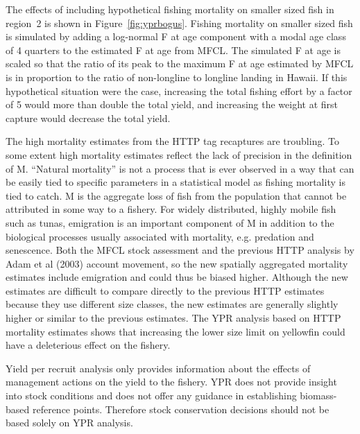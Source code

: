 \documentclass[12pt,letterpaper]{article}
\newcommand\help[1]{\color{Magenta}{\it #1 }\normalcolor}
\begin{document}
The effects of including hypothetical fishing mortality on smaller
sized fish in region~2 is shown in Figure~\ref{fig:yprbogus}. Fishing
mortality on smaller sized fish is simulated by adding a log-normal F
at age component with a modal age class of 4 quarters to the estimated
F at age from MFCL. The simulated F at age is scaled so that the
ratio of its peak to the maximum F at age estimated by MFCL is in
proportion to the ratio of non-longline to longline landing in Hawaii.
If this hypothetical situation were the case, increasing the total
fishing effort by a factor of 5 would more than double the total
yield, and increasing the weight at first capture would decrease the
total yield.

The high mortality estimates from the HTTP tag recaptures are
troubling. To some extent high mortality estimates reflect the
lack of precision in the definition of M. ``Natural mortality'' is not
a process that is ever observed in a way that can be easily tied to
specific parameters in a statistical model as fishing mortality is
tied to catch. M is the aggregate loss of fish from
the population  that cannot be attributed in some way to a
fishery. For widely distributed, highly mobile fish such as tunas,
emigration is an important component of M in addition to the
biological processes usually associated with mortality, e.g. predation and
senescence. Both the MFCL stock assessment and the previous HTTP
analysis by Adam et al (2003) account movement, so the new
spatially aggregated mortality estimates include emigration and could
thus be biased higher.
Although the new estimates are difficult to compare directly to the
previous HTTP estimates because they use different size
classes, the new estimates are generally slightly higher or similar to
the previous estimates. 
The YPR analysis based on HTTP mortality estimates shows that
increasing the lower size limit on yellowfin could have a deleterious
effect on the fishery.

Yield per recruit analysis only provides information about the effects
of management actions on the yield to the fishery. YPR does not
provide insight into stock conditions and does not offer any guidance
in establishing biomass-based reference points. Therefore stock conservation
decisions should not be based solely on YPR analysis.
\end{document}
